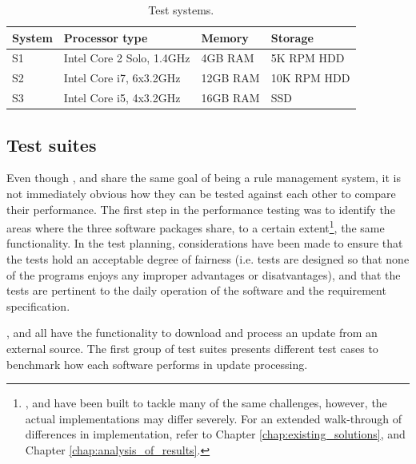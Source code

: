 \renewcommand{\arraystretch}{1.5}

\begin{table}[h!]
  \centering
  \begin{tabular}{l|l|l|l}
	System & Processor type & Memory & Storage \\
	\hline
	S1 & Intel\textregistered{} Core\texttrademark{} 2 Solo, 1.4GHz & 4GB RAM & 5K
	RPM HDD \\
	\hline
	S2 & Intel\textregistered{} Core\texttrademark{} i7, 6x3.2GHz & 12GB RAM & 10K
	RPM HDD \\
	\hline
	S3 & Intel\textregistered{} Core\texttrademark{} i5, 4x3.2GHz & 16GB RAM & SSD
	\\
	\hline
  \end{tabular}
  \caption{Test systems.}
  \label{tab:testSystems}
\end{table}

\subsection{Test suites}
Even though \snowman{}, \bhtb{} and \snortmanager{} share the same goal of being a
rule management system, it is not immediately obvious how they can be tested against
each other to compare their performance. The first step in the performance
testing was to identify the areas where the three software packages share, to a
certain extent\footnote{\snowman{}, \bhtb{} and \snortmanager{} have been built
to tackle many of the same challenges, however, the actual implementations may
differ severely. For an extended walk-through of differences in implementation,
refer to Chapter \ref{chap:existing_solutions}, and Chapter
\ref{chap:analysis_of_results}.}, the same functionality. In the
test planning, considerations have been made to ensure that the tests hold an
acceptable degree of fairness (i.e. tests are designed so that none of the
programs enjoys any improper advantages or disatvantages), and that the tests
are pertinent to the daily operation of the software and the \snowman{}
requirement specification.

\snowman{}, \bhtb{} and \snortmanager{} all have the functionality to download and
process an update from an external source. The first group of test
suites presents different test cases to benchmark how each software performs in
update processing.

